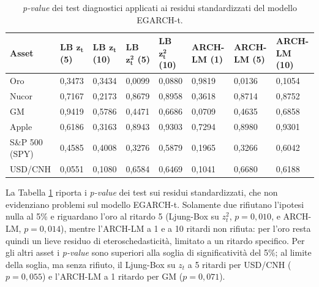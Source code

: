 \begin{table}[H]
    \centering
    \footnotesize
    \begin{tabular}{ p{} p{} p{} p{} p{} p{} p{} p{} }
        \toprule
        \textbf{Asset} & \textbf{LB $\mathbf{z_t}$ \newline (5)} & \textbf{LB $\mathbf{z_t}$ \newline (10)} & \textbf{LB $\mathbf{z_t^2}$ \newline (5)} & \textbf{LB $\mathbf{z_t^2}$ \newline (10)} & \textbf{ARCH-LM \newline (1)} & \textbf{ARCH-LM \newline (5)} & \textbf{ARCH-LM \newline (10)} \\
        \midrule
        Oro & 0,3473 & 0,3434 & 0,0099 & 0,0880 & 0,9819 & 0,0136 & 0,1054 \\ \midrule
        Nucor & 0,7167 & 0,2173 & 0,8679 & 0,8958 & 0,3618 & 0,8714 & 0,8752 \\ \midrule
        GM & 0,9419 & 0,5786 & 0,4471 & 0,6686 & 0,0709 & 0,4635 & 0,6858 \\ \midrule
        Apple & 0,6186 & 0,3163 & 0,8943 & 0,9303 & 0,7294 & 0,8980 & 0,9301 \\ \midrule
        S\&P 500 (SPY) & 0,4585 & 0,4008 & 0,3276 & 0,5879 & 0,1965 & 0,3266 & 0,6042 \\ \midrule
        USD/\newline CNH & 0,0551 & 0,1080 & 0,6584 & 0,6469 & 0,1041 & 0,6680 & 0,6188 \\
        \bottomrule
    \end{tabular}
    \vspace{5pt}
    \caption[\emph{p-value} dei test sui residui standardizzati.]{\emph{p-value} dei test diagnostici applicati ai residui standardizzati del modello EGARCH-t.}
    \label{tab:diagnostica-residui}
\end{table}

La Tabella \ref{tab:diagnostica-residui} riporta i \emph{p-value} dei test sui residui standardizzati, che non evidenziano problemi sul modello EGARCH-t. Solamente due 
rifiutano l'ipotesi nulla al 5\% e riguardano l'oro al ritardo 5 (Ljung-Box su $z_t^2$, $p = 0,010$, e ARCH-LM, $p = 0,014$), mentre l'ARCH-LM a 1 e a 10 ritardi non 
rifiuta: per l'oro resta quindi un lieve residuo di eteroschedasticità, limitato a un ritardo specifico. Per gli altri asset i \emph{p-value} sono superiori alla soglia 
di significatività del 5\%; al limite della soglia, ma senza rifiuto, il Ljung-Box su $z_t$ a 5 ritardi per USD/CNH ($p = 0,055$) e l'ARCH-LM a 1 ritardo per GM ($p = 0,071$).

